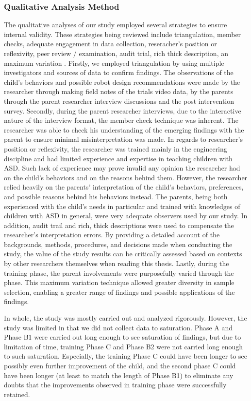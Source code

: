 \subsubsection{Qualitative Analysis Method}
The qualitative analyses of our study employed several strategies to ensure internal validity.  These strategies being reviewed include triangulation, member checks, adequate engagement in data collection, reseracher's position or reflexivity, peer review / examination, audit trial, rich thick description, an maximum variation \cite{merriam2014qualitative}.  Firstly, we employed triangulation by using multiple investigators and sources of data to confirm findings.  The observations of the child's behaviors and possible robot design recommendations were made by the researcher through making field notes of the trials video data, by the parents through the parent researcher interview discussions and the post intervention survey.  Secondly, during the parent researcher interviews, due to the interactive nature of the interview format, the member check technique was inherent.  The researcher was able to check his understanding of the emerging findings with the parent to ensure minimal misinterpretation was made.  In regards to researcher's position or reflexivity, the researcher was trained mainly in the engineering discipline and had limited experience and expertise in teaching children with ASD.  Such lack of experience may prove invalid any opinion the researcher had on the child's behaviors and on the reasons behind them.  However, the researcher relied heavily on the parents' interpretation of the child's behaviors, preferences, and possible reasons behind his behaviors instead.  The parents, being both experienced with the child's needs in particular and trained with knowledges of children with ASD in general, were very adequate observers used by our study.  In addition, audit trail and rich, thick descriptions were used to compensate the researcher's interpretation errors.  By providing a detailed account of the backgrounds, methods, procedures, and decisions made when conducting the study, the value of the study results can be critically assessed based on contexts by other researchers themselves when reading this thesis.  Lastly, during the training phase, the parent involvements were purposefully varied through the phase.  This maximum variation technique allowed greater diversity in sample selection, enabling a greater range of findings and possible applications of the findings.

In whole, the study was mostly carried out and analyzed rigorously.  However, the study was limited in that we did not collect data to saturation.  Phase A and Phase B1 were carried out long enough to see saturation of findings, but due to limitation of time, training Phase C and Phase B2 were not carried long enough to such saturation.  Especially, the training Phase C could have been longer to see possibly even further improvement of the child, and the second phase C could have been longer (at least to match the length of Phase B1) to eliminate any doubts that the improvements observed in training phase were successfully retained.


